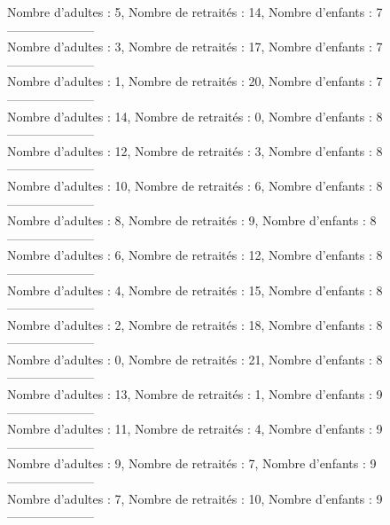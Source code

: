 \documentclass[10pt,a4paper]{article}
\begin{document}
Nombre d'adultes : 5, Nombre de retraités : 14, Nombre d'enfants : 7\\
---------------------\\
Nombre d'adultes : 3, Nombre de retraités : 17, Nombre d'enfants : 7\\
---------------------\\
Nombre d'adultes : 1, Nombre de retraités : 20, Nombre d'enfants : 7\\
---------------------\\
Nombre d'adultes : 14, Nombre de retraités : 0, Nombre d'enfants : 8\\
---------------------\\
Nombre d'adultes : 12, Nombre de retraités : 3, Nombre d'enfants : 8\\
---------------------\\
Nombre d'adultes : 10, Nombre de retraités : 6, Nombre d'enfants : 8\\
---------------------\\
Nombre d'adultes : 8, Nombre de retraités : 9, Nombre d'enfants : 8\\
---------------------\\
Nombre d'adultes : 6, Nombre de retraités : 12, Nombre d'enfants : 8\\
---------------------\\
Nombre d'adultes : 4, Nombre de retraités : 15, Nombre d'enfants : 8\\
---------------------\\
Nombre d'adultes : 2, Nombre de retraités : 18, Nombre d'enfants : 8\\
---------------------\\
Nombre d'adultes : 0, Nombre de retraités : 21, Nombre d'enfants : 8\\
---------------------\\
Nombre d'adultes : 13, Nombre de retraités : 1, Nombre d'enfants : 9\\
---------------------\\
Nombre d'adultes : 11, Nombre de retraités : 4, Nombre d'enfants : 9\\
---------------------\\
Nombre d'adultes : 9, Nombre de retraités : 7, Nombre d'enfants : 9\\
---------------------\\
Nombre d'adultes : 7, Nombre de retraités : 10, Nombre d'enfants : 9\\
---------------------\\
\end{document}
